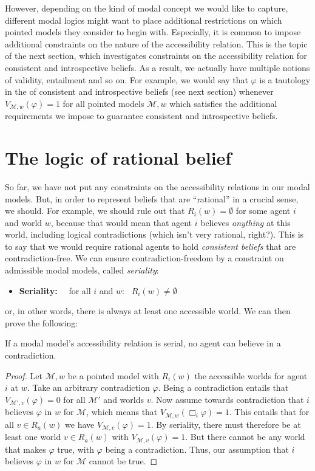 \documentclass[nobib,nofonts]{tufte-handout}
\newcommand{\Model}{\ensuremath{\mathcal{M}}}
\newcommand{\modlog}{\acro{ModLog}}
\begin{document}
However, depending on the kind of modal concept we would like to capture, different modal logics might want to place additional restrictions on which pointed models they consider to begin with.
Especially, it is common to impose additional constraints on the nature of the accessibility relation.
This is the topic of the next section, which investigates constraints on the accessibility relation for consistent and introspective beliefs.
As a result, we actually have multiple notions of validity, entailment and so on.
For example, we would say that $\varphi$ is a tautology in the \modlog of consistent and introspective beliefs (see next section) whenever $V_{\Model, w}(\varphi)=1$ for all pointed models $\Model, w$ which satisfies the additional requirements we impose to guarantee consistent and introspective beliefs.

\section{The logic of rational belief}

So far, we have not put any constraints on the accessibility relations in our modal models.
But, in order to represent beliefs that are ``rational'' in a crucial sense, we should.
For example, we should rule out that $R_{i}(w) = \emptyset$ for some agent $i$ and world $w$, because that would mean that agent $i$ believes \emph{anything} at this world, including logical contradictions (which isn't very rational, right?).
This is to say that we would require rational agents to hold \emph{consistent beliefs} that are contradiction-free.
We can ensure contradiction-freedom by a constraint on admissible modal models, called \emph{seriality}:
\begin{itemize}[]
  \item \textbf{Seriality:} \ \  for all $i$ and $w$: \ $R_{i}(w) \neq \emptyset$
\end{itemize}
or, in other words, there is always at least one accessible world.
We can then prove the following:

\begin{claim}
  If a modal model's accessibility relation is serial, no agent can believe in a contradiction.
\end{claim}
\begin{proof}
  Let $\Model, w$ be a pointed model with $R_{i}(w)$ the accessible worlds for agent $i$ at $w$.
  Take an arbitrary contradiction $\varphi$.
  Being a contradiction entails that $V_{\Model', v}(\varphi) = 0$ for all $\Model'$ and worlds $v$.
  Now assume towards contradiction that $i$ believes $\varphi$ in $w$ for $\Model$, which means that $V_{\Model, w}(\Box_{i}\varphi)=1$.
  This entails that for all $v \in R_{a}(w)$ we have $V_{\Model, v}(\varphi) = 1$.
  By seriality, there must therefore be at least one world $v \in R_{a}(w)$ with $V_{\Model, v}(\varphi) = 1$.
  But there cannot be any world that makes $\varphi$ true, with $\varphi$ being a contradiction.
  Thus, our assumption that $i$ believes $\varphi$ in $w$ for $\Model$ cannot be true.
\end{proof}
\end{document}
